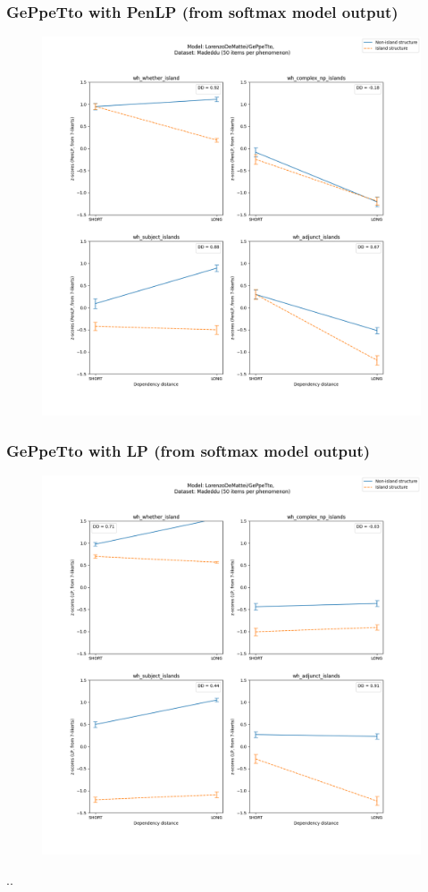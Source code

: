\subsubsection{GePpeTto with PenLP (from softmax model output)}
\begin{figure}[h]
	\centering
	\includegraphics[width=1\textwidth]{images/Chapter1/Madeddu_wh_LorenzoDeMattei_GePpeTto_PenLP-zscores-likert-2022-07-11.png} 
\end{figure}

\clearpage
\subsubsection{GePpeTto with LP (from softmax model output)}
\begin{figure}[h]
	\centering
	\includegraphics[width=1\textwidth]{images/Chapter1/Madeddu_wh_LorenzoDeMattei_GePpeTto_LP-zscores-likert-2022-07-11.png} 
\end{figure}

..